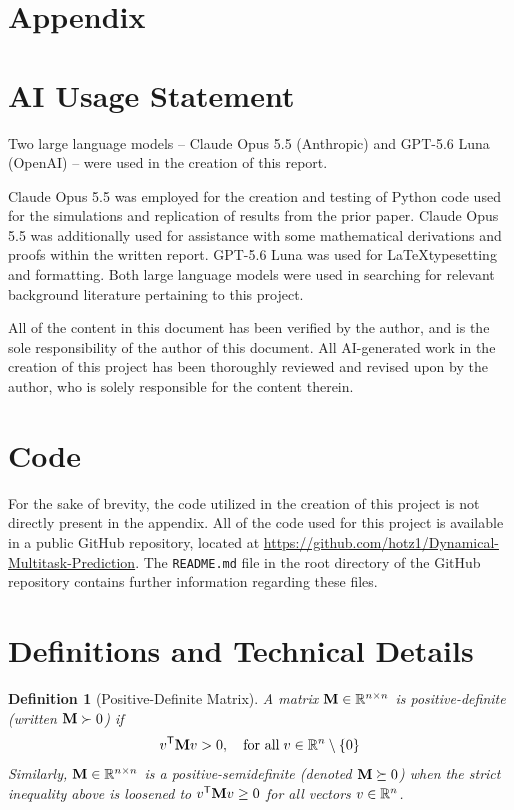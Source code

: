 \documentclass[10pt]{article}
\newtheorem{definition}{Definition}[section]
\numberwithin{equation}{section}
\begin{document}
\newpage





\newpage
\appendix
\section*{Appendix}

\section{AI Usage Statement}
Two large language models -- Claude Opus 5.5 (Anthropic) and GPT-5.6 Luna (OpenAI) -- were used in the creation of this report.

Claude Opus 5.5 was employed for the creation and testing of Python code used for the simulations and replication of results from the prior paper. Claude Opus 5.5 was additionally used for assistance with some mathematical derivations and proofs within the written report. GPT-5.6 Luna was used for \LaTeX typesetting and formatting. Both large language models were used in searching for relevant background literature pertaining to this project.

All of the content in this document has been verified by the author, and is the sole responsibility of the author of this document. All AI-generated work in the creation of this project has been thoroughly reviewed and revised upon by the author, who is solely responsible for the content therein.

\section{Code} 
\label{sec:code} 
For the sake of brevity, the code utilized in the creation of this project is not directly present in the appendix. All of the code used for this project is available in a public GitHub repository, located at \url{https://github.com/hotz1/Dynamical-Multitask-Prediction}. The \texttt{README.md} file in the root directory of the GitHub repository contains further information regarding these files.

\newpage

\section{Definitions and Technical Details}
\label{sec:definitions}

\begin{definition}[Positive-Definite Matrix]
\label{def:pos-def-matrix}
    A matrix $\mathbf{M} \in \mathbb{R}^{n \times n}$ is positive-definite (written $\mathbf{M} \succ 0$) if
    \begin{equation}
        v^{\scriptstyle{\mathsf{T}}}\mathbf{M}{v} > 0, \quad \textrm{for all}\; v \in \mathbb{R}^{n} \setminus \{0\}
    \end{equation}
    Similarly, $\mathbf{M} \in \mathbb{R}^{n \times n}$ is a positive-semidefinite (denoted $\mathbf{M} \succeq 0$) when the strict inequality above is loosened to $v^{\scriptstyle{\mathsf{T}}}\mathbf{M}{v} \ge 0$ for all vectors $v \in \mathbb{R}^{n}$.  
\end{definition}
\end{document}
